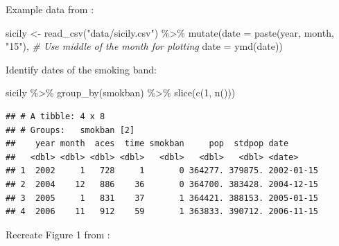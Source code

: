 \documentclass[
]{book}
\newenvironment{Shaded}{\begin{snugshade}}{\end{snugshade}}
\newcommand{\AttributeTok}[1]{\textcolor[rgb]{0.77,0.63,0.00}{#1}}
\newcommand{\CommentTok}[1]{\textcolor[rgb]{0.56,0.35,0.01}{\textit{#1}}}
\newcommand{\DecValTok}[1]{\textcolor[rgb]{0.00,0.00,0.81}{#1}}
\newcommand{\FunctionTok}[1]{\textcolor[rgb]{0.00,0.00,0.00}{#1}}
\newcommand{\NormalTok}[1]{#1}
\newcommand{\OtherTok}[1]{\textcolor[rgb]{0.56,0.35,0.01}{#1}}
\newcommand{\SpecialCharTok}[1]{\textcolor[rgb]{0.00,0.00,0.00}{#1}}
\newcommand{\StringTok}[1]{\textcolor[rgb]{0.31,0.60,0.02}{#1}}
\begin{document}
Example data from \citet{bernal2017interrupted}:

\begin{Shaded}
\begin{Highlighting}[]
\NormalTok{sicily }\OtherTok{\textless{}{-}} \FunctionTok{read\_csv}\NormalTok{(}\StringTok{"data/sicily.csv"}\NormalTok{) }\SpecialCharTok{\%\textgreater{}\%} 
  \FunctionTok{mutate}\NormalTok{(}\AttributeTok{date =} \FunctionTok{paste}\NormalTok{(year, month, }\StringTok{"15"}\NormalTok{), }\CommentTok{\# Use middle of the month for plotting}
         \AttributeTok{date =} \FunctionTok{ymd}\NormalTok{(date))}
\end{Highlighting}
\end{Shaded}

Identify dates of the smoking band:

\begin{Shaded}
\begin{Highlighting}[]
\NormalTok{sicily }\SpecialCharTok{\%\textgreater{}\%} 
  \FunctionTok{group\_by}\NormalTok{(smokban) }\SpecialCharTok{\%\textgreater{}\%} 
  \FunctionTok{slice}\NormalTok{(}\FunctionTok{c}\NormalTok{(}\DecValTok{1}\NormalTok{, }\FunctionTok{n}\NormalTok{()))}
\end{Highlighting}
\end{Shaded}

\begin{verbatim}
## # A tibble: 4 x 8
## # Groups:   smokban [2]
##    year month  aces  time smokban     pop  stdpop date      
##   <dbl> <dbl> <dbl> <dbl>   <dbl>   <dbl>   <dbl> <date>    
## 1  2002     1   728     1       0 364277. 379875. 2002-01-15
## 2  2004    12   886    36       0 364700. 383428. 2004-12-15
## 3  2005     1   831    37       1 364421. 388153. 2005-01-15
## 4  2006    11   912    59       1 363833. 390712. 2006-11-15
\end{verbatim}

Recreate Figure 1 from \citet{bernal2017interrupted}:
\end{document}
